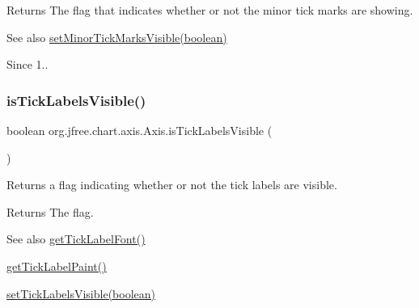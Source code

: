 \begin{DoxyReturn}{Returns}
The flag that indicates whether or not the minor tick marks are showing.
\end{DoxyReturn}
\begin{DoxySeeAlso}{See also}
\mbox{\hyperlink{classorg_1_1jfree_1_1chart_1_1axis_1_1_axis_a00f878920447c433934aa54030843def}{set\+Minor\+Tick\+Marks\+Visible(boolean)}}
\end{DoxySeeAlso}
\begin{DoxySince}{Since}
1.. 
\end{DoxySince}
\mbox{\label{classorg_1_1jfree_1_1chart_1_1axis_1_1_axis_a243036cb23e9771ee4d26f9b749115cb}} 
\subsubsection{\texorpdfstring{is\+Tick\+Labels\+Visible()}{isTickLabelsVisible()}}
{\footnotesize\ttfamily boolean org.\+jfree.\+chart.\+axis.\+Axis.\+is\+Tick\+Labels\+Visible (\begin{DoxyParamCaption}{ }\end{DoxyParamCaption})}

Returns a flag indicating whether or not the tick labels are visible.

\begin{DoxyReturn}{Returns}
The flag.
\end{DoxyReturn}
\begin{DoxySeeAlso}{See also}
\mbox{\hyperlink{classorg_1_1jfree_1_1chart_1_1axis_1_1_axis_afa78f4c22da7b2d268e127767789ed4d}{get\+Tick\+Label\+Font()}} 

\mbox{\hyperlink{classorg_1_1jfree_1_1chart_1_1axis_1_1_axis_a76c5c5924b56a2936b516e7fe3ab50ee}{get\+Tick\+Label\+Paint()}} 

\mbox{\hyperlink{classorg_1_1jfree_1_1chart_1_1axis_1_1_axis_abcdadb52fe3b84309f229467ef6d6f82}{set\+Tick\+Labels\+Visible(boolean)}} 
\end{DoxySeeAlso}
\mbox{\label{classorg_1_1jfree_1_1chart_1_1axis_1_1_axis_ad1eb8269abe3384082e89700eaea08d0}} 
